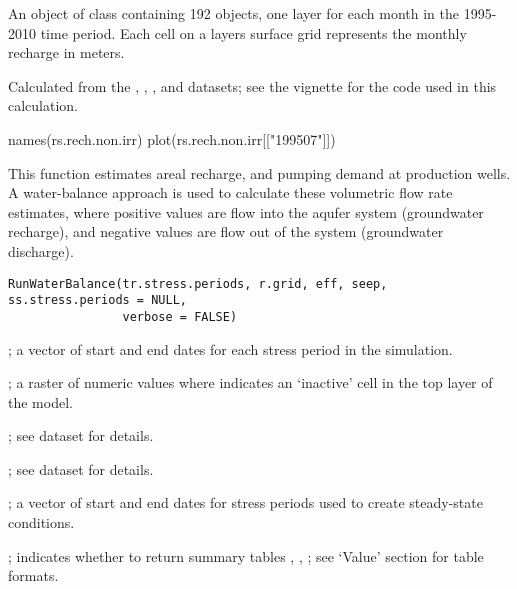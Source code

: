 \documentclass[a4paper]{book}
\begin{document}
%
\begin{Format}
An object of  class containing 192  objects, one layer for each month in the 1995-2010 time period.
Each cell on a layers surface grid represents the monthly recharge in meters.
\end{Format}
%
\begin{Source}\relax
Calculated from the , , , and  datasets;
see the  vignette for the \R{} code used in this calculation.
\end{Source}
%
\begin{Examples}
\begin{ExampleCode}
names(rs.rech.non.irr)
plot(rs.rech.non.irr[["199507"]])
\end{ExampleCode}
\end{Examples}
%
\begin{Description}\relax
This function estimates areal recharge, and pumping demand at production wells.
A water-balance approach is used to calculate these volumetric flow rate estimates,
where positive values are flow into the aqufer system (groundwater recharge),
and negative values are flow out of the system (groundwater discharge).
\end{Description}
%
\begin{Usage}
\begin{verbatim}
RunWaterBalance(tr.stress.periods, r.grid, eff, seep, ss.stress.periods = NULL,
                verbose = FALSE)
\end{verbatim}
\end{Usage}
%
\begin{Arguments}
\begin{ldescription}
\item[\code{tr.stress.periods}] ; a vector of start and end dates for each stress period in the simulation.
\item[\code{r.grid}] ; a raster of numeric values where  indicates an `inactive' cell in the top layer of the model.
\item[\code{eff}] ; see  dataset for details.
\item[\code{seep}] ; see  dataset for details.
\item[\code{ss.stress.periods}] ; a vector of start and end dates for stress periods used to create steady-state conditions.
\item[\code{verbose}] ; indicates whether to return summary tables , , ;
see `Value' section for table formats.
\end{ldescription}
\end{Arguments}
\end{document}
